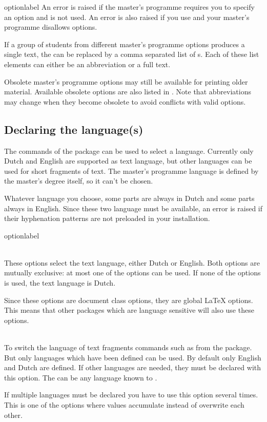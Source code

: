 \begin{labelled}{optionlabel}
  An error is raised if the master's programme requires you to specify an
  option and  is not used. An error is also raised
  if you use  and your master's programme disallows options.

  If a group of students from different master's programme options produces a
  single text, the  can be replaced by a comma separated list of
  s. Each of these list elements can either be an abbreviation or a
  full text.

  Obsolete master's programme options may still be available for printing older
  material. Available obsolete options are also listed in
  . Note that abbreviations may change when they become
  obsolete to avoid conflicts with valid options.
\end{labelled}

\subsection{Declaring the language(s)}
The commands of the  package can be used to select a language.
Currently only Dutch and English are supported as text language, but other
languages can be used for short fragments of text. The master's programme
language is defined by the master's degree itself, so it can't be chosen.

Whatever language you choose, some parts are always in Dutch and some parts
always in English. Since these two language must be available, an error is
raised if their hyphenation patterns are not preloaded in your installation.

\begin{labelled}{optionlabel}
\item[dutch \and english]\\
  These options select the text language, either Dutch or English.
  Both options are mutually exclusive: at most one of the options can be used.
  If none of the options is used, the text language is Dutch.

  Since these options are document class options, they are global LaTeX
  options. This means that other packages which are language sensitive will
  also use these options.

\item[extralanguage=\meta{lang}]\\
  To switch the language of text fragments commands such as
   from the  package. But only languages
  which have been defined can be used. By default only English and Dutch
  are defined. If other languages are needed, they must be declared with
  this  option. The  can be any language
  known to .

  If multiple languages must be declared you have to use this option
  several times. This is one of the options where values accumulate instead
  of overwrite each other.
\end{labelled}

